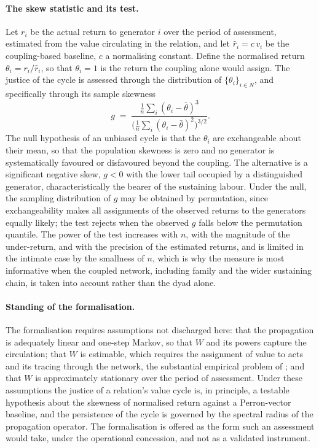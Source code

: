 \paragraph{The skew statistic and its test.}
Let $r_i$ be the actual return to generator $i$ over the period of assessment, estimated from the value circulating in the relation, and let $\hat{r}_i = c\, v_i$ be the coupling-based baseline, $c$ a normalising constant. Define the normalised return $\theta_i = r_i / \hat{r}_i$, so that $\theta_i = 1$ is the return the coupling alone would assign. The justice of the cycle is assessed through the distribution of $\{\theta_i\}_{i \in N}$, and specifically through its sample skewness
\[
g \;=\; \frac{\frac{1}{n}\sum_{i}(\theta_i - \bar{\theta})^3}{\Big(\frac{1}{n}\sum_{i}(\theta_i - \bar{\theta})^2\Big)^{3/2}} .
\]
The null hypothesis of an unbiased cycle is that the $\theta_i$ are exchangeable about their mean, so that the population skewness is zero and no generator is systematically favoured or disfavoured beyond the coupling. The alternative is a significant negative skew, $g < 0$ with the lower tail occupied by a distinguished generator, characteristically the bearer of the sustaining labour. Under the null, the sampling distribution of $g$ may be obtained by permutation, since exchangeability makes all assignments of the observed returns to the generators equally likely; the test rejects when the observed $g$ falls below the permutation quantile. The power of the test increases with $n$, with the magnitude of the under-return, and with the precision of the estimated returns, and is limited in the intimate case by the smallness of $n$, which is why the measure is most informative when the coupled network, including family and the wider sustaining chain, is taken into account rather than the dyad alone.

\paragraph{Standing of the formalisation.}
The formalisation requires assumptions not discharged here: that the propagation is adequately linear and one-step Markov, so that $W$ and its powers capture the circulation; that $W$ is estimable, which requires the assignment of value to acts and its tracing through the network, the substantial empirical problem of ; and that $W$ is approximately stationary over the period of assessment. Under these assumptions the justice of a relation's value cycle is, in principle, a testable hypothesis about the skewness of normalised return against a Perron-vector baseline, and the persistence of the cycle is governed by the spectral radius of the propagation operator. The formalisation is offered as the form such an assessment would take, under the operational concession, and not as a validated instrument.

